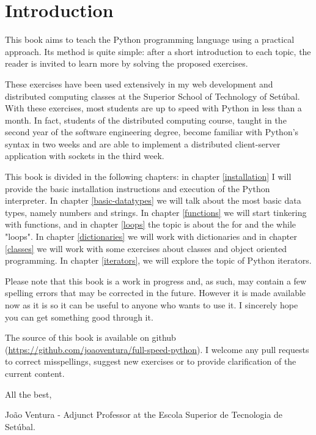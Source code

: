 \chapter{Introduction}\label{introduction}

This book aims to teach the Python programming language using a practical approach. Its method is quite simple: after a short introduction to each topic, the reader is invited to learn more by solving the proposed exercises.

These exercises have been used extensively in my web development and distributed computing classes at the Superior School of Technology of Setúbal. With these exercises, most students are up to speed with Python in less than a month. In fact, students of the distributed computing course, taught in the second year of the software engineering degree, become familiar with Python's syntax in two weeks and are able to implement a distributed client-server application with sockets in the third week.

This book is divided in the following chapters: in chapter \ref{installation} I will provide the basic installation instructions and execution of the Python interpreter. In chapter \ref{basic-datatypes} we will talk about the most basic data types, namely numbers and strings. In chapter \ref{functions} we will start tinkering with functions, and in chapter \ref{loops} the topic is about the for and the while "loops". In chapter \ref{dictionaries} we will work with dictionaries and in chapter \ref{classes} we will work with some exercises about classes and object oriented programming. In chapter \ref{iterators}, we will explore the topic of Python iterators.

Please note that this book is a work in progress and, as such, may contain a few spelling errors that may be corrected in the future. However it is made available now as it is so it can be useful to anyone who wants to use it. I sincerely hope you can get something good through it.

The source of this book is available on github (\url{https://github.com/joaoventura/full-speed-python}). I welcome any pull requests to correct misspellings, suggest new exercises or to provide clarification of the current content.

All the best,

João Ventura - Adjunct Professor at the Escola Superior de Tecnologia de Setúbal.
